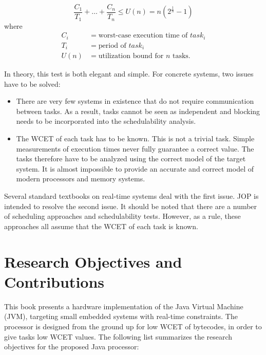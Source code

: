 \begin{samepage}
\begin{equation}
\nonumber
    \frac{C_1}{T_1}+\dots+\frac{C_n}{T_n} \le U(n) = n(2^{\frac{1}{n}}-1)
\end{equation}
%
where
\begin{equation}
\nonumber
    \begin{split}
        C_i & = \mbox{worst-case execution time of } task_i \\
        T_i & = \mbox{period of } task_i \\
        U(n) & = \mbox{utilization bound for $n$ tasks.}
    \end{split}
\end{equation}
\end{samepage}
%
In theory, this test is both elegant and simple. For concrete
systems, two issues have to be solved:
%
\begin{itemize}
    \item There are very few systems in existence that do not require
    communication between tasks.
    As a result, tasks cannot be seen as independent and blocking
    needs to be incorporated into the schedulability analysis.
    \item The WCET of each task has to be known. This is not a
    trivial task. Simple measurements of execution times never fully
    guarantee a correct value. The tasks therefore have to be analyzed
    using  the correct model of the target system. It is almost
    impossible to provide an accurate and correct model of modern
    processors and memory systems.
\end{itemize}
%
Several standard textbooks on real-time systems \cite{
book:klein-real-time-analysis-ratetm, 558498} deal with the first
issue. JOP is intended to resolve the second issue. It should be
noted that there are a number of scheduling approaches and
schedulability tests. However, as a rule, these approaches all
assume that the WCET of each task is known.


\section{Research Objectives and Contributions}


This book presents a hardware implementation of the Java Virtual
Machine (JVM), targeting small embedded systems with real-time
constraints. The processor is designed from the ground up for low
WCET of bytecodes, in order to give tasks low WCET values. The
following list summarizes the research objectives for the proposed
Java processor:
%
